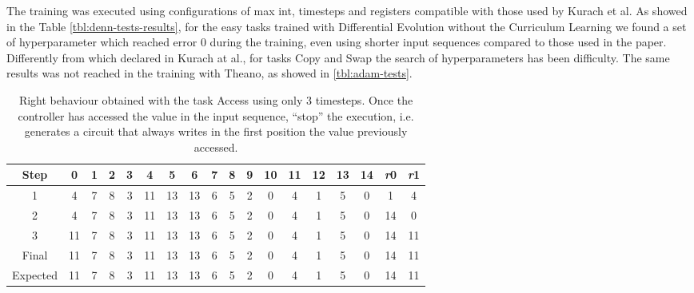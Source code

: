 \iffalse
\begin{figure}[t]
	\centering
	\begin{tikzpicture}[samples=100,smooth, scale=.875]
			\begin{axis}[
 				axis x line=center,
  				axis y line=center,
 				xlabel={Sequence A length},
  				ylabel={Error rate},
    				x label style={at={(axis description cs:0.5,-0.115)},anchor=north},
    				y label style={at={(axis description cs:-0.115,.5)},rotate=90,anchor=south},    				
			    grid=both,
			    grid style={line width=.1pt, draw=gray!10},
			    major grid style={line width=.2pt,draw=gray!50},
			    xtick={10, 20, 30 50, 100, 500, 1000},
			    xmin=0, xmax=1000,
			    ymin=0, ymax=1,
				legend style={at={(0.5,-0.25)},anchor=north}		
			]
  				\addplot table{data/swap-error-rate-CL.txt};
  				\addlegendentry{Swap CL}
			\end{axis}
	\end{tikzpicture}
	\label{fig:nram-tests-error-rate-plot}
	\caption{Error rate of best controllers in generalization tests.}
\end{figure}
\fi
The training was executed using configurations of max int, timesteps and registers compatible with those used by Kurach et al. As showed in the Table \ref{tbl:denn-tests-results}, for the easy tasks trained with Differential Evolution without the Curriculum Learning we found a set of hyperparameter which reached error 0 during the training, even using shorter input sequences compared to those used in the paper. Differently from which declared in Kurach at al., for tasks Copy and Swap the search of hyperparameters has been difficulty. The same results was not reached in the training with Theano, as showed in \ref{tbl:adam-tests}. 
\begin{table}[h]
	\centering
	\begin{tabular}{c|ccccccccccccccc|cc}
		\rowcolor{Gray}\textbf{Step} & 0 & 1 & 2 & 3 & 4 & 5 & 6 & 7 & 8 & 9 & 10 & 11 & 12 & 13 & 14 & \textit{r}0 & \textit{r}1 \\ \hline 
1 & 4 & 7 & 8 & 3 & 11 & 13 & 13 & 6 & 5 & 2 & 0 & 4 & 1 & 5 & 0 & 1 & 4 \\ 
2 & 4 & 7 & 8 & 3 & 11 & 13 & 13 & 6 & 5 & 2 & 0 & 4 & 1 & 5 & 0 & 14 & 0 \\ 
3 & 11 & 7 & 8 & 3 & 11 & 13 & 13 & 6 & 5 & 2 & 0 & 4 & 1 & 5 & 0 & 14 & 11 \\ \hline 
\rowcolor{Gray}Final & 11 & 7 & 8 & 3 & 11 & 13 & 13 & 6 & 5 & 2 & 0 & 4 & 1 & 5 & 0 & 14 & 11 \\
\rowcolor{Gray}Expected & 11 & 7 & 8 & 3 & 11 & 13 & 13 & 6 & 5 & 2 & 0 & 4 & 1 & 5 & 0 & 14 & 11 \\
	\end{tabular}
	\label{tbl:right-behaviour}
	\caption{Right behaviour obtained with the task Access using only 3 timesteps. Once the controller has accessed the value in the input sequence, ``stop'' the execution, i.e. generates a circuit that always writes in the first position the value previously accessed.}
\end{table}
